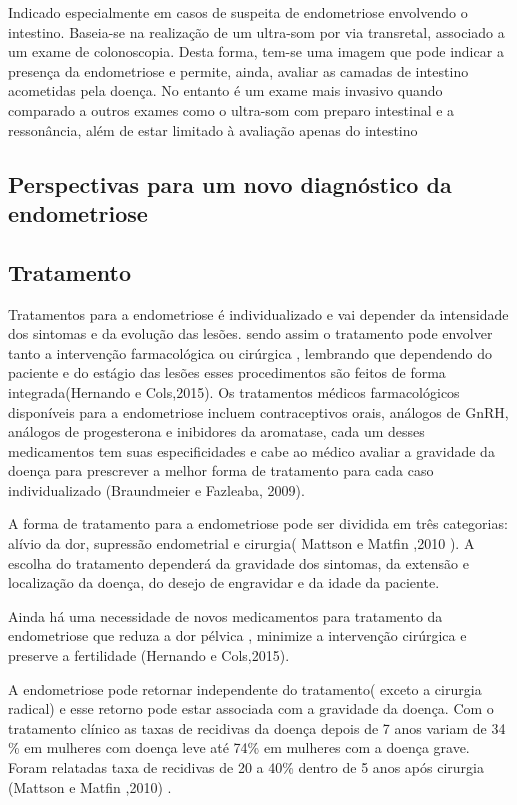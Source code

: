 \documentclass[12pt]{article} %
\begin{document}
Indicado especialmente em casos de suspeita de endometriose envolvendo o intestino. Baseia-se na realização de um ultra-som por via transretal, associado a um exame de colonoscopia. Desta forma, tem-se uma imagem que pode indicar a presença da endometriose e permite, ainda, avaliar as camadas de intestino acometidas pela doença. No entanto é um exame mais invasivo quando comparado a outros exames como o ultra-som com preparo intestinal e a ressonância, além de estar limitado à avaliação apenas do intestino


\subsection{Perspectivas para um novo diagnóstico da endometriose}














\subsection{Tratamento} 
Tratamentos para a endometriose é individualizado e vai depender da intensidade dos sintomas e da evolução das lesões. sendo assim o tratamento pode envolver tanto a intervenção farmacológica ou cirúrgica , lembrando que dependendo do paciente e do estágio das lesões esses procedimentos são feitos de forma integrada(Hernando e Cols,2015). Os tratamentos médicos farmacológicos disponíveis para a endometriose incluem contraceptivos orais, análogos de GnRH, análogos de progesterona e inibidores da aromatase, cada um desses medicamentos tem suas especificidades e cabe ao médico avaliar a gravidade da doença para prescrever a melhor forma de tratamento para cada caso individualizado (Braundmeier e Fazleaba, 2009).

A forma de tratamento para a endometriose pode ser dividida em três categorias: alívio da dor, supressão endometrial e cirurgia( Mattson e Matfin ,2010 ). A escolha do tratamento dependerá da gravidade dos sintomas, da extensão e localização da doença, do desejo de engravidar e da idade da paciente.

Ainda há uma necessidade de novos medicamentos para tratamento da endometriose que reduza a dor pélvica , minimize a intervenção cirúrgica e preserve a fertilidade (Hernando e Cols,2015).


A endometriose pode retornar independente do tratamento( exceto a cirurgia radical) e esse retorno pode estar associada com a gravidade da doença. Com o tratamento clínico as taxas de recidivas da doença depois de 7 anos variam de 34 \% em mulheres com doença leve até 74\% em mulheres com a doença grave. Foram relatadas taxa de recidivas de 20 a 40\% dentro de 5 anos após cirurgia (Mattson e Matfin ,2010) .
\end{document}
